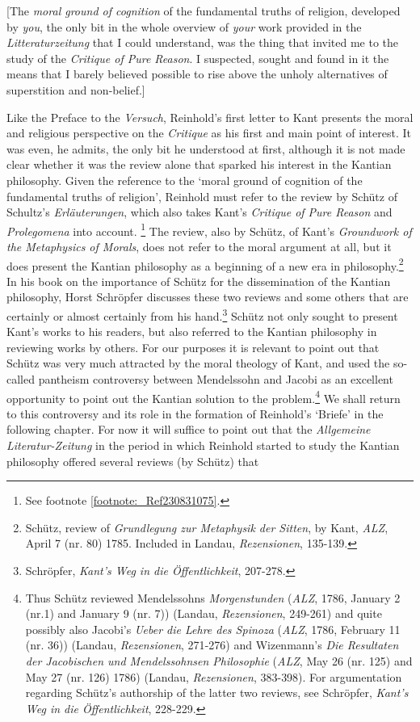 [The \textit{moral ground of cognition} of the fundamental truths of religion, developed by \textit{you}, the only bit in the whole overview of \textit{your} work provided in the \textit{Litteraturzeitung} that I could understand, was the thing that invited me to the study of the \textit{Critique of Pure Reason}. I suspected, sought and found in it the means that I barely believed possible to rise above the unholy alternatives of superstition and non{-}belief.]

Like the Preface to the \textit{Versuch}, Reinhold's first letter to Kant presents the moral and religious perspective on the \textit{Critique} as his first and main point of interest. It was even, he admits, the only bit he understood at first, although it is not made clear whether it was the review alone that sparked his interest in the Kantian philosophy. Given the reference to the `moral ground of cognition of the fundamental truths of religion', Reinhold must refer to the review by Sch\"{u}tz of Schultz's \textit{Erl\"{a}uterungen}, which also takes Kant's \textit{Critique of Pure Reason} and \textit{Prolegomena} into account. \footnote{ See footnote \ref{footnote:_Ref230831075}. } The review, also by Sch\"{u}tz, of Kant's \textit{Groundwork of the Metaphysics of Morals}, does not refer to the moral argument at all, but it does present the Kantian philosophy as a beginning of a new era in philosophy.\footnote{ Sch\"{u}tz, review of \textit{Grundlegung zur Metaphysik der Sitten}, by Kant, \textit{ALZ}, April 7 (nr. 80) 1785. Included in Landau, \textit{Rezensionen}, 135{-}139. } In his book on the importance of Sch\"{u}tz for the dissemination of the Kantian philosophy, Horst Schr\"{o}pfer discusses these two reviews and some others that are certainly or almost certainly from his hand.\footnote{ Schr\"{o}pfer, \textit{Kant's Weg in die \"{O}ffentlichkeit}, 207{-}278.} Sch\"{u}tz not only sought to present Kant's works to his readers, but also referred to the Kantian philosophy in reviewing works by others. For our purposes it is relevant to point out that Sch\"{u}tz was very much attracted by the moral theology of Kant, and used the so{-}called pantheism controversy between Mendelssohn and Jacobi as an excellent opportunity to point out the Kantian solution to the problem.\footnote{ Thus Sch\"{u}tz reviewed Mendelssohns \textit{Morgenstunden} (\textit{ALZ}, 1786, January 2 (nr.1) and January 9 (nr. 7)) (Landau, \textit{Rezensionen}, 249{-}261) and quite possibly also Jacobi's \textit{Ueber die Lehre des Spinoza }(\textit{ALZ}, 1786, February 11 (nr. 36)) (Landau, \textit{Rezensionen}, 271{-}276) and Wizenmann's \textit{Die Resultaten der Jacobischen und Mendelssohnsen Philosophie} (\textit{ALZ}, May 26 (nr. 125) and May 27 (nr. 126) 1786) (Landau, \textit{Rezensionen}, 383{-}398). For argumentation regarding Sch\"{u}tz's authorship of the latter two reviews, see Schr\"{o}pfer, \textit{Kant's Weg in die \"{O}ffentlichkeit}, 228{-}229. } We shall return to this controversy and its role in the formation of Reinhold's `Briefe' in the following chapter. For now it will suffice to point out that the \textit{Allgemeine Literatur{-}Zeitung} in the period in which Reinhold started to study the Kantian philosophy offered several reviews (by Sch\"{u}tz) that 